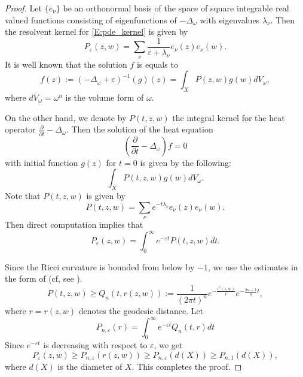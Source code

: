 \documentclass{amsart}
\theoremstyle{definition}
\numberwithin{equation}{section}
\begin{document}
\begin{proof}
Let $\{e_\nu\}$ be an orthonormal basis of the space of square integrable real valued functions consisting of eigenfunctions of $-\Delta_\omega$ with eigenvalues $\lambda_\nu$. Then the resolvent kernel for \eqref{E:pde_kernel} is given by
\begin{equation*}
P_{\varepsilon}(z,w)
=
\sum_\nu\frac{1}{{\varepsilon}+\lambda_\nu}e_\nu(z)e_\nu(w).
\end{equation*}
It is well known that the solution $f$ is equals to
\begin{equation*}
f(z):=(-\Delta_\omega+{\varepsilon})^{-1}(g)(z)
=
\int_X P(z,w)g(w) dV_\omega,
\end{equation*}
where $dV_\omega=\omega^n$ is the volume form of $\omega$.

On the other hand, we denote by $P(t,z,w)$ the integral kernel for the heat operator ${\frac{\partial{}}{\partial{t}}}-\Delta_\omega$. Then the solution of the heat equation 
\begin{equation*}
{\left({{\frac{\partial{}}{\partial{t}}}-\Delta_\omega}\right)}f=0
\end{equation*}
with initial function $g(z)$ for $t=0$ is given by the following:
\begin{equation*}
\int_X P(t,z,w)g(w) dV_\omega.
\end{equation*}
Note that $P(t,z,w)$ is given by
\begin{equation*}
P(t,z,w)
=
\sum_\nu e^{-t\lambda_\nu}e_\nu(z)e_\nu(w).
\end{equation*}
Then direct computation implies that
\begin{equation*}
P_{\varepsilon}(z,w)
=
\int_0^\infty e^{-{\varepsilon} t}P(t,z,w) dt.
\end{equation*}

Since the Ricci curvature is bounded from below by $-1$, we use the estimates in the form of \cite{Sturm} (cf, see \cite{Cheeger:Yau}).
\begin{equation*}
P(t,z,w)\ge
Q_n(t,r(z,w)):=
\frac{1}{(2\pi t)^n}
e^{-\frac{r^2(z,w)}{t}}
e^{-\frac{2n-1}{4}t},
\end{equation*}
where $r=r(z,w)$ denotes the geodesic distance. Let
\begin{equation*}
P_{n,{\varepsilon}}(r)=\int_0^\infty e^{-{\varepsilon} t}Q_n(t,r)dt
\end{equation*}
Since $e^{-{\varepsilon} t}$ is decreasing with respect to ${\varepsilon}$, we get
\begin{equation*}
P_{\varepsilon}(z,w)\ge
P_{n,{\varepsilon}}(r(z,w))\ge
P_{n,{\varepsilon}}(d(X))\ge
P_{n,1}(d(X)),
\end{equation*}
where $d(X)$ is the diameter of $X$. This completes the proof.
\end{proof}
\end{document}

